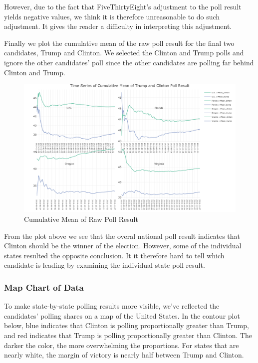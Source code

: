 \documentclass[
  12pt,
]{article}
\begin{document}
However, due to the fact that FiveThirtyEight's adjustment to the poll
result yields negative values, we think it is therefore unreasonable to
do such adjustment. It gives the reader a difficulty in interpreting
this adjustment.

Finally we plot the cumulative mean of the raw poll result for the final
two candidates, Trump and Clinton. We selected the Clinton and Trump
polls and ignore the other candidates' poll since the other candidates
are polling far behind Clinton and Trump.

\begin{figure}
\centering
\includegraphics{./Figures/cMeanchart.png}
\caption{Cumulative Mean of Raw Poll Result}
\end{figure}

From the plot above we see that the overal national poll result
indicates that Clinton should be the winner of the election. However,
some of the individual states resulted the opposite conclusion. It it
therefore hard to tell which candidate is leading by examining the
individual state poll result.

\hypertarget{map-chart-of-data}{%
\subsubsection{Map Chart of Data}\label{map-chart-of-data}}

To make state-by-state polling results more visible, we've reflected the
candidates' polling shares on a map of the United States. In the contour
plot below, blue indicates that Clinton is polling proportionally
greater than Trump, and red indicates that Trump is polling
proportionally greater than Clinton. The darker the color, the more
overwhelming the proportions. For states that are nearly white, the
margin of victory is nearly half between Trump and Clinton.
\end{document}
